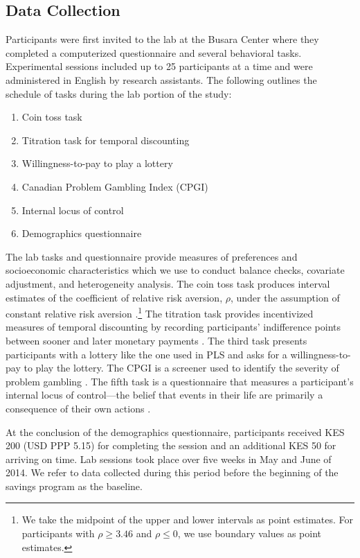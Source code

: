 \documentclass[11pt]{article}
\begin{document}
	\subsection{Data Collection}

		Participants were first invited to the lab at the Busara Center where they completed a computerized questionnaire and several behavioral tasks. Experimental sessions included up to 25 participants at a time and were administered in English by research assistants. The following outlines the schedule of tasks during the lab portion of the study:

		\begin{enumerate} \setlength{\itemsep}{1pt}
		\item Coin toss task
		\item Titration task for temporal discounting
		\item Willingness-to-pay to play a lottery
		\item Canadian Problem Gambling Index (CPGI)
		\item Internal locus of control 
		\item Demographics questionnaire
		\end{enumerate}

		The lab tasks and questionnaire provide measures of preferences and socioeconomic characteristics which we use to conduct balance checks, covariate adjustment, and heterogeneity analysis. The coin toss task produces interval estimates of the coefficient of relative risk aversion, $\rho$, under the assumption of constant relative risk aversion \parencite{eckel_sex_2002}.\footnote{We take the midpoint of the upper and lower intervals as point estimates. For participants with $\rho \geq 3.46$ and $\rho \leq 0$, we use boundary values as point estimates.} The titration task provides incentivized measures of temporal discounting by recording participants' indifference points between sooner and later monetary payments \parencite{cornsweet_staircase-method_1962}. The third task presents participants with a lottery like the one used in PLS and asks for a willingness-to-pay to play the lottery. The CPGI is a screener used to identify the severity of problem gambling \parencite{ferris_canadian_2001}. The fifth task is a questionnaire that measures a participant's internal locus of control---the belief that events in their life are primarily a consequence of their own actions \parencite{rotter_generalized_1966}.

		At the conclusion of the demographics questionnaire, participants received KES 200 (USD PPP 5.15) for completing the session and an additional KES 50 for arriving on time. Lab sessions took place over five weeks in May and June of 2014. We refer to data collected during this period before the beginning of the savings program as the baseline.
\end{document}
